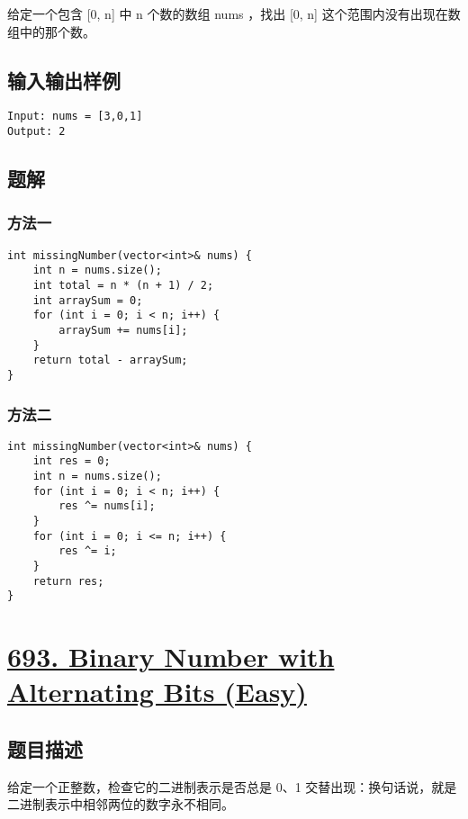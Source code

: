 \documentclass[lang=cn,10pt]{elegantbook}
\begin{document}
给定一个包含 [0, n] 中 n 个数的数组 nums ，找出 [0, n] 这个范围内没有出现在数组中的那个数。

\subsection*{输入输出样例}

\begin{lstlisting}
Input: nums = [3,0,1]
Output: 2
\end{lstlisting}

\subsection*{题解}

\subsubsection*{方法一}

\begin{lstlisting}
int missingNumber(vector<int>& nums) {
	int n = nums.size();
	int total = n * (n + 1) / 2;
	int arraySum = 0;
	for (int i = 0; i < n; i++) {
		arraySum += nums[i];
	}
	return total - arraySum;
}
\end{lstlisting}

\subsubsection*{方法二}

\begin{lstlisting}
int missingNumber(vector<int>& nums) {
	int res = 0;
	int n = nums.size();
	for (int i = 0; i < n; i++) {
		res ^= nums[i];
	}
	for (int i = 0; i <= n; i++) {
		res ^= i;
	}
	return res;
}
\end{lstlisting}

{\color{red}\section{\href{https://leetcode.cn/problems/binary-number-with-alternating-bits/}{693. Binary Number with Alternating Bits (Easy)}}} \label{ch10.693}

\subsection*{题目描述}

给定一个正整数，检查它的二进制表示是否总是 0、1 交替出现：换句话说，就是二进制表示中相邻两位的数字永不相同。
\end{document}
